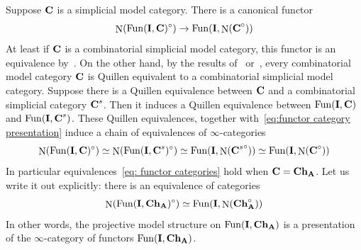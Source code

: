 \documentclass[psamsfonts]{amsart}
\theoremstyle{plain}
\theoremstyle{definition}
\theoremstyle{remark}
\newcommand{\catname}[1]{{\normalfont\textbf{#1}}}
\newcommand{\ch}{\catname{Ch}}
\DeclareMathOperator{\Nerve}{N}
\DeclareMathOperator{\fun}{Fun}
\begin{document}
Suppose $\catname{C}$ is a simplicial model category. There is a canonical functor
\begin{equation}\label{eq:functor category presentation}
\Nerve(\fun(\catname{I}, \catname{C})^{\circ})\to \fun(\catname{I}, \Nerve(\catname{C}^{\circ}))
\end{equation}
At least if $\catname{C}$ is a combinatorial simplicial model category, this functor is an equivalence by~\cite[Proposition 4.2.4.4]{LurieHTT}. On the other hand, by the results of~\cite{Rezk-Schwede-Shipley} or~\cite{Dugger01}, every combinatorial model category $\catname{C}$ is Quillen equivalent to a combinatorial simplicial model category. Suppose there is a Quillen equivalence between $\catname{C}$ and a combinatorial simplicial category $\catname{C}^s$. Then it induces a Quillen equivalence between $\fun(\catname{I}, \catname{C})$ and $\fun(\catname{I}, \catname{C}^s)$. These Quillen equivalences, together with~\eqref{eq:functor category presentation} induce a chain of equivalences of $\infty$-categories
\begin{equation}\label{eq: functor categories}
\Nerve(\fun(\catname{I}, \catname{C})^{\circ})\simeq\Nerve(\fun(\catname{I}, \catname{C}^s)^{\circ})\simeq \fun(\catname{I}, \Nerve({\catname{C}^s}^{\circ}))\simeq \fun(\catname{I}, \Nerve(\catname{C}^{\circ}))
\end{equation}
In particular equivalences~\eqref{eq: functor categories} hold when $\catname{C}=\ch_{\catname{A}}$. Let us write it out explicitly: there is an equivalence of categories
\begin{equation}\label{eq:functors into chain complexes presentation}
\Nerve(\fun(\catname{I}, \ch_{\catname{A}})^{\circ}) \simeq \fun(\catname{I}, \Nerve(\ch_{\catname{A}}^{\circ}))
\end{equation}
In other words, the projective model structure on $\fun(\catname{I}, \ch_{\catname{A}})$ is  a presentation of the $\infty$-category of functors $\fun(\catname{I}, \ch_{\catname{A}})$. 
\end{document}
